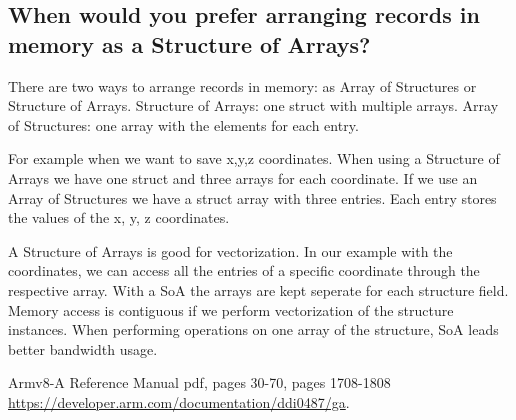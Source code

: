 \documentclass[runningheads]{llncs}
\begin{document}
\subsection{When would you prefer arranging records in memory as a Structure of Arrays?}
There are two ways to arrange records in memory: as Array of Structures or Structure of Arrays.
Structure of Arrays: one struct with multiple arrays.
Array of Structures: one array with the elements for each entry.

For example when we want to save x,y,z coordinates. When using a Structure of Arrays we have one struct and three arrays for each coordinate.
If we use an Array of Structures we have a struct array with three entries. Each entry stores the values of the x, y, z coordinates.

A Structure of Arrays is good for vectorization. In our example with the coordinates, we can access all the entries of a specific coordinate
through the respective array.
With a SoA the arrays are kept seperate for each structure field. Memory access is contiguous if we perform vectorization of the structure instances.
When performing operations on one array of the structure, SoA leads better bandwidth usage.

%
%
%
% 
% 
%
\begin{thebibliography}{8}

Armv8-A Reference Manual pdf, pages 30-70, pages 1708-1808 \\ \url{https://developer.arm.com/documentation/ddi0487/ga}.

\end{thebibliography}
\end{document}
